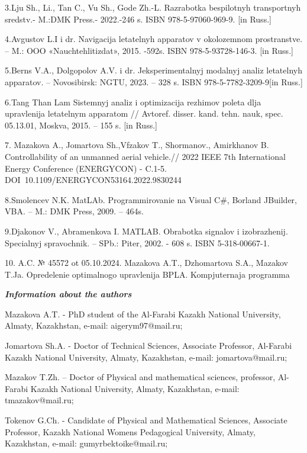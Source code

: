3.Lju Sh., Li., Tan C., Vu Sh., God\textquotesingle e Zh.-L. Razrabotka
bespilotnyh transportnyh sredstv.- M.:DMK Press.- 2022.-246 s. ISBN
978-5-97060-969-9. {[}in Russ.{]}

4.Avgustov L.I i dr. Navigacija letatel\textquotesingle nyh apparatov v
okolozemnom prostranstve. -- M.: OOO «Nauchtehlitizdat», 2015. -592s.
ISBN 978-5-93728-146-3. {[}in Russ.{]}

5.Berns V.A., Dolgopolov A.V. i dr. Jeksperimental\textquotesingle nyj
modal\textquotesingle nyj analiz letatel\textquotesingle nyh apparatov.
-- Novosibirsk: NGTU, 2023. -- 328 s. ISBN 978-5-7782-3209-9{[}in
Russ.{]}

6.Tang Than\textquotesingle{} Lam Sistemnyj analiz i optimizacija
rezhimov poleta dlja upravlenija letatel\textquotesingle nym apparatom
// Avtoref. disser. kand. tehn. nauk, spec. 05.13.01, Moskva, 2015. --
155 s. {[}in Russ.{]}

7. Mazakova A., Jomartova Sh.,Vfzakov T., Shormanov., Amirkhanov B.
Controllability of an unmanned aerial vehicle.// 2022 IEEE 7th
International Energy Conference (ENERGYCON) - C.1-5.
DOI~10.1109/ENERGYCON53164.2022.9830244

8.Smolencev N.K. MatLAb. Programmirovanie na Visual C\#, Borland
JBuilder, VBA. -- M.: DMK Press, 2009. -- 464s.

9.D\textquotesingle jakonov V., Abramenkova I. MATLAB. Obrabotka
signalov i izobrazhenij. Special\textquotesingle nyj spravochnik. --
SPb.: Piter, 2002. - 608 s. ISBN 5-318-00667-1.

10. A.C. № 45572 ot 05.10.2024. Mazakova A.T., Dzhomartova S.A., Mazakov
T.Ja. Opredelenie optimal\textquotesingle nogo upravlenija BPLA.
Komp\textquotesingle juternaja programma

\emph{{\bfseries Information about the authors}}

Mazakova A.T. - PhD student of the Al-Farabi Kazakh National University,
Almaty, Kazakhstan, e-mail: aigerym97@mail.ru;

Jomartova Sh.A. - Doctor of Technical Sciences, Associate Professor,
Al-Farabi Kazakh National University, Almaty, Kazakhstan, e-mail:
jomartova@mail.ru;

Mazakov T.Zh. -- Doctor of Physical and mathematical sciences,
professor, Al-Farabi Kazakh National University, Almaty, Kazakhstan,
e-mail: tmazakov@mail.ru;

Tokenov G.Ch. - Candidate of Physical and Mathematical Sciences,
Associate Professor, Kazakh National Women\textquotesingle s Pedagogical
University, Almaty, Kazakhstan, e-mail: gumyrbektoike@mail.ru;


